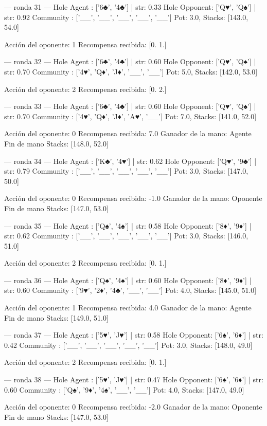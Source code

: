 --- ronda 31 ---
Hole Agent : ['6♣', '4♣'] | str: 0.33
Hole Opponent: ['Q♥', 'Q♠'] | str: 0.92
Community  : ['__', '__', '__', '__', '__']
Pot: 3.0, Stacks: [143.0, 54.0]

Acción del oponente: 1
Recompensa recibida: [0. 1.]

--- ronda 32 ---
Hole Agent : ['6♣', '4♣'] | str: 0.60
Hole Opponent: ['Q♥', 'Q♠'] | str: 0.70
Community  : ['4♥', 'Q♦', 'J♦', '__', '__']
Pot: 5.0, Stacks: [142.0, 53.0]

Acción del oponente: 2
Recompensa recibida: [0. 2.]

--- ronda 33 ---
Hole Agent : ['6♣', '4♣'] | str: 0.60
Hole Opponent: ['Q♥', 'Q♠'] | str: 0.70
Community  : ['4♥', 'Q♦', 'J♦', 'A♥', '__']
Pot: 7.0, Stacks: [141.0, 52.0]

Acción del oponente: 0
Recompensa recibida: 7.0
Ganador de la mano: Agente
Fin de mano Stacks: [148.0, 52.0]


--- ronda 34 ---
Hole Agent : ['K♣', '4♥'] | str: 0.62
Hole Opponent: ['Q♥', '9♣'] | str: 0.79
Community  : ['__', '__', '__', '__', '__']
Pot: 3.0, Stacks: [147.0, 50.0]

Acción del oponente: 0
Recompensa recibida: -1.0
Ganador de la mano: Oponente
Fin de mano Stacks: [147.0, 53.0]


--- ronda 35 ---
Hole Agent : ['Q♠', '4♠'] | str: 0.58
Hole Opponent: ['8♦', '9♦'] | str: 0.62
Community  : ['__', '__', '__', '__', '__']
Pot: 3.0, Stacks: [146.0, 51.0]

Acción del oponente: 2
Recompensa recibida: [0. 1.]

--- ronda 36 ---
Hole Agent : ['Q♠', '4♠'] | str: 0.60
Hole Opponent: ['8♦', '9♦'] | str: 0.60
Community  : ['9♥', '2♦', '4♣', '__', '__']
Pot: 4.0, Stacks: [145.0, 51.0]

Acción del oponente: 1
Recompensa recibida: 4.0
Ganador de la mano: Agente
Fin de mano Stacks: [149.0, 51.0]


--- ronda 37 ---
Hole Agent : ['5♥', 'J♥'] | str: 0.58
Hole Opponent: ['6♠', '6♦'] | str: 0.42
Community  : ['__', '__', '__', '__', '__']
Pot: 3.0, Stacks: [148.0, 49.0]

Acción del oponente: 2
Recompensa recibida: [0. 1.]

--- ronda 38 ---
Hole Agent : ['5♥', 'J♥'] | str: 0.47
Hole Opponent: ['6♠', '6♦'] | str: 0.60
Community  : ['Q♠', '9♦', '4♠', '__', '__']
Pot: 4.0, Stacks: [147.0, 49.0]

Acción del oponente: 0
Recompensa recibida: -2.0
Ganador de la mano: Oponente
Fin de mano Stacks: [147.0, 53.0]


